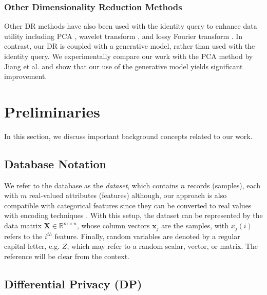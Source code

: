 \documentclass[USenglish,oneside,twocolumn]{article}
\theoremstyle{definition}
\theoremstyle{remark}
\theoremstyle{plain}
\theoremstyle{plain}
\begin{document}
\vspace{-1em}
\subsubsection{Other Dimensionality Reduction Methods}

Other DR methods have also been used with the identity query to enhance
data utility including PCA \cite{RefWorks:339}, wavelet transform
\cite{RefWorks:224}, and lossy Fourier transform \cite{RefWorks:219}.
In contrast, our DR is coupled with a generative model, rather than
used with the identity query. We experimentally compare our
work with the PCA method by Jiang et al. \cite{RefWorks:339} and
show that our use of the generative model yields significant improvement.

\section{Preliminaries}
\label{sec:preliminaries}
In this section, we discuss important background concepts related
to our work.

\vspace{-1em}
\subsection{Database Notation}

\label{subsec:notation} 

We refer to the database as the \emph{dataset}, which contains $n$
records (samples), each with $m$ real-valued attributes (features)
\textendash{} although, our approach is also compatible with categorical
features since they can be converted to real values with encoding
techniques \cite{RefWorks:226}. With this setup, the dataset can
be represented by the data matrix $\mathbf{X}\in\mathbb{R}^{m\times n}$,
whose column vectors $\mathbf{x}_{j}$ are the samples, with $x_{j}(i)$
refers to the $i^{th}$ feature. Finally, random variables are denoted
by a regular capital letter, e.g. $Z$, which may refer to a random
scalar, vector, or matrix. The reference will be clear from the context.

\vspace{-1em}
\subsection{Differential Privacy (DP)}
\end{document}
